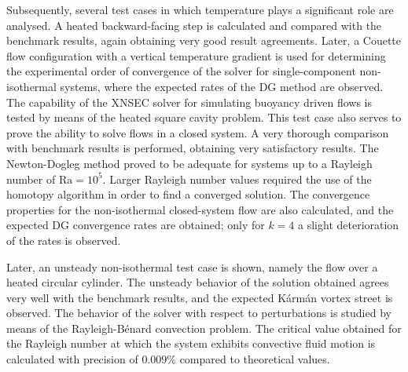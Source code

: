 Subsequently, several test cases in which temperature plays a significant role are analysed. A heated backward-facing step is calculated and compared with the benchmark results, again obtaining very good result agreements. Later, a Couette flow configuration with a vertical temperature gradient is used for determining the experimental order of convergence of the solver for single-component non-isothermal systems, where the expected rates of the DG method are observed. The capability of the XNSEC solver for simulating buoyancy driven flows is tested by means of the heated square cavity problem. This test case also serves to prove the ability to solve flows in a closed system. A very thorough comparison with benchmark results is performed, obtaining very satisfactory results. The Newton-Dogleg method proved to be adequate for systems up to a Rayleigh number of $\text{Ra} = 10^5$. Larger Rayleigh number values required the use of the homotopy algorithm in order to find a converged solution. The convergence properties for the non-isothermal closed-system flow are also calculated, and the expected DG convergence rates are obtained; only for $k=4$ a slight deterioration of the rates is observed.

Later, an unsteady non-isothermal test case is shown, namely the flow over a heated circular cylinder. The unsteady behavior of the solution obtained agrees very well with the benchmark results, and the expected Kármán vortex street is observed. The behavior of the solver with respect to perturbations is studied by means of the Rayleigh-Bénard convection problem. The critical value obtained for the Rayleigh number at which the system exhibits convective fluid motion is calculated with precision of $0.009\%$ compared to theoretical values. 


